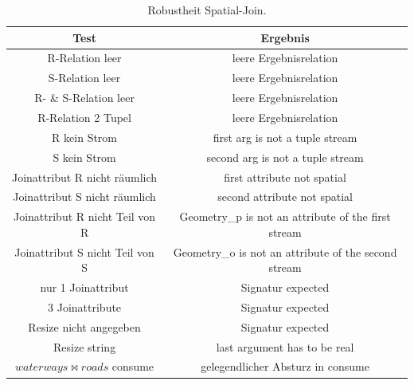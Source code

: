 \documentclass[a4paper,12pt,twoside]{article}
\begin{document}
\begin{table}
	\centering
	\begin{tabular}{|c|c|}
		\hline
		\rowcolor{gray!30}
		Test & Ergebnis \\ 
		\hline
		R-Relation leer & leere Ergebnisrelation \\ 
		\hline
		S-Relation leer & leere Ergebnisrelation \\ 
		\hline
		R- \& S-Relation leer & leere Ergebnisrelation \\ 
		\hline
		R-Relation 2 Tupel & leere Ergebnisrelation \\ 
		\hline
		R kein Strom & first arg is not a tuple stream \\ 
		\hline
		S kein Strom & second arg is not a tuple stream \\ 
		\hline
		Joinattribut R nicht räumlich & first attribute not spatial \\ 
		\hline
		Joinattribut S nicht räumlich & second attribute not spatial \\ 
		\hline
		Joinattribut R nicht Teil von R & Geometry\_p is not an attribute of the first stream \\ 
		\hline
		Joinattribut S nicht Teil von S & Geometry\_o is not an attribute of the second stream \\ 
		\hline
		nur 1 Joinattribut & Signatur expected \\
		\hline
		3 Joinattribute &  Signatur expected \\
		\hline
		Resize nicht angegeben & Signatur expected \\ 
		\hline
		Resize string & last argument has to be real \\ 
		\hline
		$waterways \bowtie roads$ consume & gelegendlicher Absturz in consume \\
		\hline
	\end{tabular}
	\caption{\label{tab:testSpatialRobust}Robustheit Spatial-Join.}
\end{table}
\end{document}

